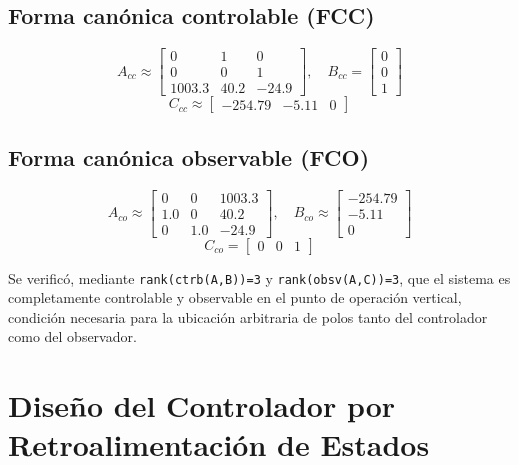 \documentclass[conference]{IEEEtran}
\begin{document}
\subsection{Forma canónica controlable (FCC)}
\begin{equation}
A_{cc} \approx \begin{bmatrix} 0 & 1 & 0 \\ 0 & 0 & 1 \\ 1003.3 & 40.2 & -24.9 \end{bmatrix},\quad
B_{cc} = \begin{bmatrix} 0 \\ 0 \\ 1 \end{bmatrix}
\end{equation}
\begin{equation}
C_{cc} \approx \begin{bmatrix} -254.79 & -5.11 & 0 \end{bmatrix}
\end{equation}

\subsection{Forma canónica observable (FCO)}
\begin{equation}
A_{co} \approx \begin{bmatrix} 0 & 0 & 1003.3 \\ 1.0 & 0 & 40.2 \\ 0 & 1.0 & -24.9 \end{bmatrix},\quad
B_{co} \approx \begin{bmatrix} -254.79 \\ -5.11 \\ 0 \end{bmatrix}
\end{equation}
\begin{equation}
C_{co} = \begin{bmatrix} 0 & 0 & 1 \end{bmatrix}
\end{equation}

Se verificó, mediante \texttt{rank(ctrb(A,B))=3} y \texttt{rank(obsv(A,C))=3}, que el sistema es completamente controlable y observable en el punto de operación vertical, condición necesaria para la ubicación arbitraria de polos tanto del controlador como del observador.

\section{Diseño del Controlador por Retroalimentación de Estados}
\label{sec:controlador}
\end{document}
